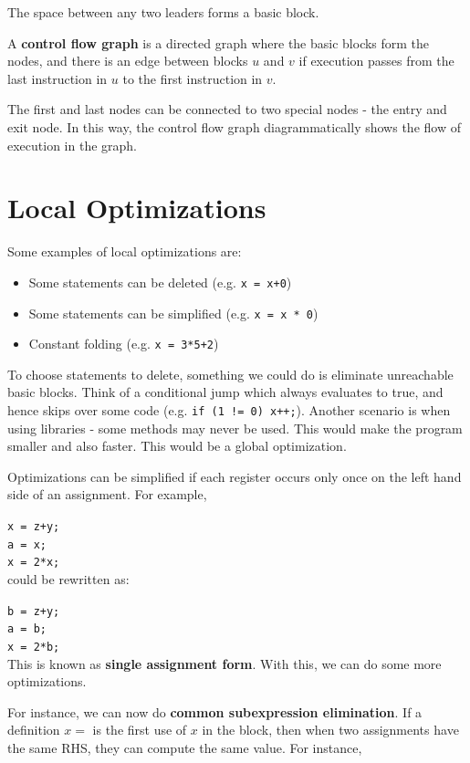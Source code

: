 \documentclass[12pt,letterpaper]{book}
\theoremstyle{definition}
\begin{document}
The space between any two leaders forms a basic block.

A \textbf{control flow graph}  is a directed graph where the basic blocks form the nodes, and there is an edge between blocks $u$ and $v$ if execution passes from the last instruction in $u$ to the first instruction in $v$.

The first and last nodes can be connected to two special nodes - the entry and exit node. In this way, the control flow graph diagrammatically shows the flow of execution in the graph.

\section{Local Optimizations}

Some examples of local optimizations are:
\begin{itemize}
  \item Some statements can be deleted (e.g. \texttt{x = x+0})
  \item Some statements can be simplified (e.g. \texttt{x = x * 0})
  \item Constant folding (e.g. \texttt{x = 3*5+2})
\end{itemize}

To choose statements to delete, something we could do is eliminate unreachable basic blocks. Think of a conditional jump which always evaluates to true, and hence skips over some code (e.g. \texttt{if (1 != 0) x++;}). Another scenario is when using libraries - some methods may never be used. This would make the program smaller and also faster. This would be a global optimization.

Optimizations can be simplified if each register occurs only once on the left hand side of an assignment. For example,

\texttt{x = z+y;} \\
\texttt{a = x;} \\
\texttt{x = 2*x;} \\
could be rewritten as:

\texttt{b = z+y;}\\
\texttt{a = b;}\\
\texttt{x = 2*b;}\\
This is known as \textbf{single assignment form}. With this, we can do some more optimizations.

For instance, we can now do \textbf{common subexpression elimination}. If a definition $x = $ is the first use of $x$ in the block, then when two assignments have the same RHS, they can compute the same value. For instance,
\end{document}
